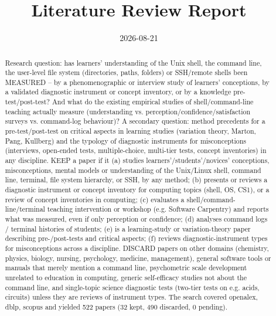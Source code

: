 \documentclass{article}
\title{Literature Review Report}
\date{2026-08-21}
\begin{document}
\maketitle

\begin{abstract}
Research question: has learners' understanding of the Unix shell, the command line, the user-level file system (directories, paths, folders) or SSH/remote shells been MEASURED -- by a phenomenographic or interview study of learners' conceptions, by a validated diagnostic instrument or concept inventory, or by a knowledge pre-test/post-test? And what do the existing empirical studies of shell/command-line teaching actually measure (understanding vs. perception/confidence/satisfaction surveys vs. command-log behaviour)? A secondary question: method precedents for a pre-test/post-test on critical aspects in learning studies (variation theory, Marton, Pang, Kullberg) and the typology of diagnostic instruments for misconceptions (interviews, open-ended tests, multiple-choice, multi-tier tests, concept inventories) in any discipline. KEEP a paper if it (a) studies learners'/students'/novices' conceptions, misconceptions, mental models or understanding of the Unix/Linux shell, command line, terminal, file system hierarchy, or SSH, by any method; (b) presents or reviews a diagnostic instrument or concept inventory for computing topics (shell, OS, CS1), or a review of concept inventories in computing; (c) evaluates a shell/command-line/terminal teaching intervention or workshop (e.g. Software Carpentry) and reports what was measured, even if only perception or confidence; (d) analyses command logs / terminal histories of students; (e) is a learning-study or variation-theory paper describing pre-/post-tests and critical aspects; (f) reviews diagnostic-instrument types for misconceptions across a discipline. DISCARD papers on other domains (chemistry, physics, biology, nursing, psychology, medicine, management), general software tools or manuals that merely mention a command line, psychometric scale development unrelated to education in computing, generic self-efficacy studies not about the command line, and single-topic science diagnostic tests (two-tier tests on e.g. acids, circuits) unless they are reviews of instrument types. The search covered openalex, dblp, scopus and yielded 522 papers (32 kept, 490 discarded, 0 pending).
\end{abstract}
\clearpage
\clearpage
\tableofcontents
\clearpage
\end{document}
